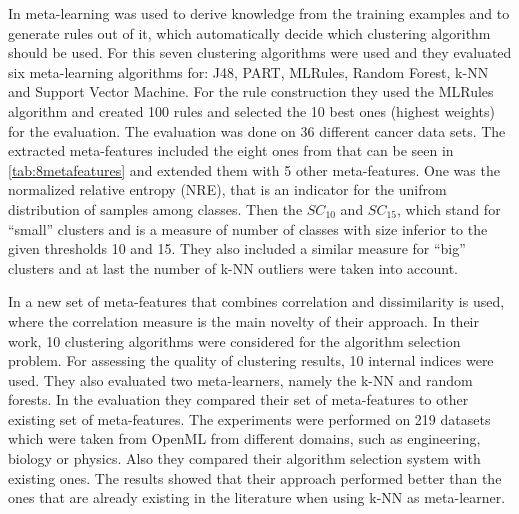 In \cite{NascimentoMiningData} meta-learning was used to derive knowledge from the training examples and to generate rules out of it, which automatically decide which clustering algorithm should be used.
For this seven clustering algorithms were used and they evaluated six meta-learning algorithms for: J48, PART, MLRules, Random Forest, k-NN and Support Vector Machine.
For the rule construction they used the MLRules algorithm and created 100 rules and selected the 10 best ones (highest weights) for the evaluation.
The evaluation was done on 36 different cancer data sets.
The extracted meta-features included the eight ones from \cite{DeSoutoRankingApproach} that can be seen in \cref{tab:8metafeatures} and extended them with 5 other meta-features. One was the normalized relative entropy (NRE), that is an indicator for the unifrom distribution of samples among classes. Then the  $SC_{10}$ and $SC_{15}$, which stand for ``small'' clusters and is a measure of number of classes with size inferior to the given thresholds 10 and 15.
They also included a similar measure for ``big'' clusters and at last the number of k-NN outliers were taken into account.

In \cite{Pimentel2019AMeta-learning} a new set of meta-features that combines correlation and dissimilarity is used, where the correlation measure is the main novelty of their approach.
In their work, 10 clustering algorithms were considered for the algorithm selection problem.
For assessing the quality of clustering results, 10 internal indices were used.
They also evaluated two meta-learners, namely the k-NN and random forests.
In the evaluation they compared their set of meta-features to other existing set of meta-features.
The experiments were performed on 219 datasets which were taken from OpenML from different domains, such as engineering, biology or physics.
Also they compared their algorithm selection system with existing ones.
The results showed that their approach performed better than the ones that are already existing in the literature when using k-NN as meta-learner.


